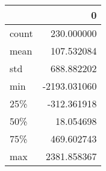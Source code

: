 \begin{tabular}{lr}
\toprule
{} &            0 \\
\midrule
count &   230.000000 \\
mean  &   107.532084 \\
std   &   688.882202 \\
min   & -2193.031060 \\
25\%   &  -312.361918 \\
50\%   &    18.054698 \\
75\%   &   469.602743 \\
max   &  2381.858367 \\
\bottomrule
\end{tabular}
